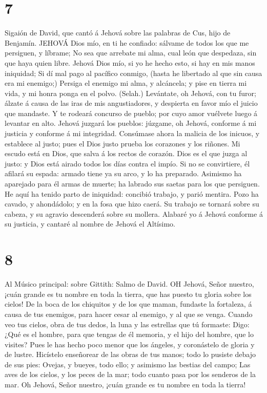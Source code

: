 \hypertarget{section-6}{%
\section{7}\label{section-6}}

 Sigaión de David, que cantó á Jehová sobre las palabras de
Cus, hijo de Benjamín. JEHOVÁ Dios mío, en ti he confiado: sálvame de
todos los que me persiguen, y líbrame;  No sea que arrebate
mi alma, cual león que despedaza, sin que haya quien libre. 
Jehová Dios mío, si yo he hecho esto, si hay en mis manos iniquidad;
 Si dí mal pago al pacífico conmigo, (hasta he libertado al
que sin causa era mi enemigo;)  Persiga el enemigo mi alma,
y alcáncela; y pise en tierra mi vida, y mi honra ponga en el polvo.
(Selah.)  Levántate, oh Jehová, con tu furor; álzate á causa
de las iras de mis angustiadores, y despierta en favor mío el juicio que
mandaste.  Y te rodeará concurso de pueblo; por cuyo amor
vuélvete luego á levantar en alto.  Jehová juzgará los
pueblos: júzgame, oh Jehová, conforme á mi justicia y conforme á mi
integridad.  Consúmase ahora la malicia de los inicuos, y
establece al justo; pues el Dios justo prueba los corazones y los
riñones.  Mi escudo está en Dios, que salva á los rectos de
corazón.  Dios es el que juzga al justo: y Dios está airado
todos los días contra el impío.  Si no se convirtiere, él
afilará su espada: armado tiene ya su arco, y lo ha preparado.
 Asimismo ha aparejado para él armas de muerte; ha labrado
sus saetas para los que persiguen.  He aquí ha tenido parto
de iniquidad: concibió trabajo, y parió mentira.  Pozo ha
cavado, y ahondádolo; y en la fosa que hizo caerá.  Su
trabajo se tornará sobre su cabeza, y su agravio descenderá sobre su
mollera.  Alabaré yo á Jehová conforme á su justicia, y
cantaré al nombre de Jehová el Altísimo.

\hypertarget{section-7}{%
\section{8}\label{section-7}}

 Al Músico principal: sobre Gittith: Salmo de David. OH
Jehová, Señor nuestro, ¡cuán grande es tu nombre en toda la tierra, que
has puesto tu gloria sobre los cielos!  De la boca de los
chiquitos y de los que maman, fundaste la fortaleza, á causa de tus
enemigos, para hacer cesar al enemigo, y al que se venga. 
Cuando veo tus cielos, obra de tus dedos, la luna y las estrellas que tú
formaste:  Digo: ¿Qué es el hombre, para que tengas de él
memoria, y el hijo del hombre, que lo visites?  Pues le has
hecho poco menor que los ángeles, y coronástelo de gloria y de lustre.
 Hicístelo enseñorear de las obras de tus manos; todo lo
pusiste debajo de sus pies:  Ovejas, y bueyes, todo ello; y
asimismo las bestias del campo;  Las aves de los cielos, y
los peces de la mar; todo cuanto pasa por los senderos de la mar.
 Oh Jehová, Señor nuestro, ¡cuán grande es tu nombre en toda
la tierra!


